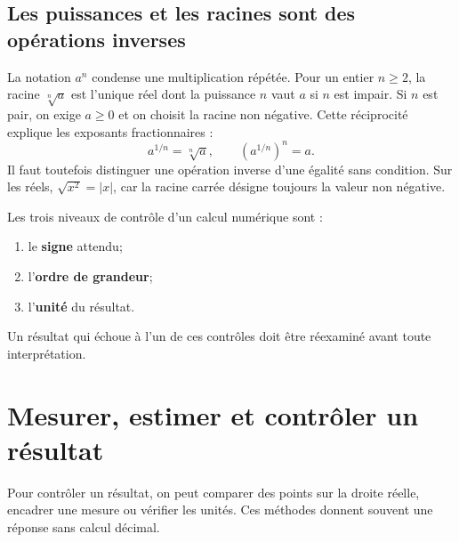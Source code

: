 \begin{center}
\end{center}

\subsection{Les puissances et les racines sont des opérations inverses}
La notation $a^n$ condense une multiplication répétée. Pour un entier \(n\ge2\), la racine \(\sqrt[n]{a}\) est l'unique réel dont la puissance \(n\) vaut \(a\) si \(n\) est impair. Si \(n\) est pair, on exige \(a\ge0\) et on choisit la racine non négative. Cette réciprocité explique les exposants fractionnaires :
\[
a^{1/n}=\sqrt[n]{a},
\qquad
(a^{1/n})^n=a.
\]
Il faut toutefois distinguer une opération inverse d'une égalité sans condition. Sur les réels, $\sqrt{x^2}=|x|$, car la racine carrée désigne toujours la valeur non négative.

\begin{visualbox}
Les trois niveaux de contrôle d'un calcul numérique sont :
\begin{enumerate}
\item le \textbf{signe} attendu;
\item l'\textbf{ordre de grandeur};
\item l'\textbf{unité} du résultat.
\end{enumerate}
Un résultat qui échoue à l'un de ces contrôles doit être réexaminé avant toute interprétation.
\end{visualbox}


\section{Mesurer, estimer et contrôler un résultat}
\label{manual:section:01.07}

Pour contrôler un résultat, on peut comparer des points sur la droite réelle, encadrer une mesure ou vérifier les unités. Ces méthodes donnent souvent une réponse sans calcul décimal.

